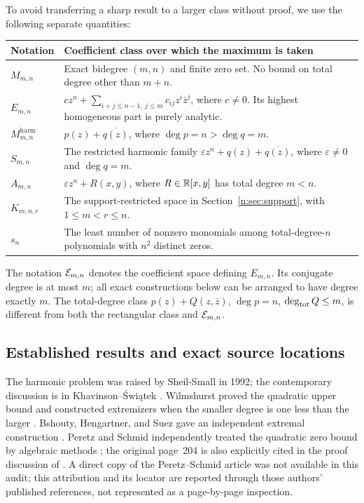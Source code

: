 \documentclass[UTF8,11pt]{ctexart}
\theoremstyle{definition}
\numberwithin{equation}{section}
\begin{document}
To avoid transferring a sharp result to a larger class without proof, we use the following separate quantities:
\begin{longtable}{@{}>{\raggedright\arraybackslash}p{}>{\raggedright\arraybackslash}p{}@{}}
\toprule
Notation & Coefficient class over which the maximum is taken \\
\midrule
\endhead
$M_{m,n}$ & Exact bidegree $(m,n)$ and finite zero set. No bound on total degree other than $m+n$.\\
$E_{m,n}$ & $cz^n+\sum_{i+j\le n-1,\ j\le m}c_{ij}z^i\bar z^j$, where $c\ne0$. Its highest homogeneous part is purely analytic.\\
$M^{\mathrm{harm}}_{m,n}$ & $p(z)+\overline{q(z)}$, where $\deg p=n>\deg q=m$.\\
$S_{m,n}$ & The restricted harmonic family $\varepsilon z^n+q(z)+\overline{q(z)}$, where $\varepsilon\ne0$ and $\deg q=m$.\\
$A_{m,n}$ & $\varepsilon z^n+R(x,y)$, where $R\in\mathbb R[x,y]$ has total degree $m<n$.\\
$K_{m,n,r}$ & The support-restricted space in Section~\ref{n:sec:support}, with $1\le m<r\le n$.\\
$s_n$ & The least number of nonzero monomials among total-degree-$n$ polynomials with $n^2$ distinct zeros.\\
\bottomrule
\end{longtable}
The notation $\mathcal E_{m,n}$ denotes the coefficient space defining $E_{m,n}$. Its conjugate degree is at most $m$; all exact constructions below can be arranged to have degree exactly $m$. The total-degree class $p(z)+Q(z,\bar z)$, $\deg p=n$, $\deg_{\rm tot}Q\le m$, is different from both the rectangular class and $\mathcal E_{m,n}$.

\subsection{Established results and exact source locations}\label{sec:history}
The harmonic problem was raised by Sheil-Small in 1992; the contemporary discussion is in Khavinson--\'{S}wi\k{a}tek \cite[pp.~409--410]{KS03}. Wilmshurst proved the quadratic upper bound and constructed extremizers when the smaller degree is one less than the larger \cite[pp.~2077--2080]{Wil98}. Bshouty, Hengartner, and Suez gave an independent extremal construction \cite[pp.~207--218]{BHS95}. Peretz and Schmid independently treated the quadratic zero bound by algebraic methods \cite[pp.~203--208]{PS97}; the original page~204 is also explicitly cited in the proof discussion of \cite[p.~6]{SZ24}. A direct copy of the Peretz--Schmid article was not available in this audit; this attribution and its locator are reported through those authors' published references, not represented as a page-by-page inspection.
\end{document}
